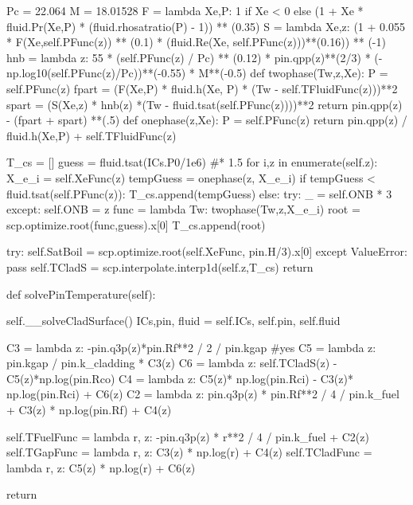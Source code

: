 \documentclass{article}
\begin{document}
\begin{python}
        Pc = 22.064
        M = 18.01528
        F = lambda Xe,P: 1 if Xe < 0 else (1 + Xe * fluid.Pr(Xe,P) * (fluid.rhosatratio(P) - 1)) ** (0.35)
        S = lambda Xe,z: (1 + 0.055 * F(Xe,self.PFunc(z)) ** (0.1) * (fluid.Re(Xe, self.PFunc(z)))**(0.16)) ** (-1)
        hnb = lambda z: 55 * (self.PFunc(z) / Pc) ** (0.12) * pin.qpp(z)**(2/3) * (-np.log10(self.PFunc(z)/Pc))**(-0.55) * M**(-0.5)
        def twophase(Tw,z,Xe):
            P = self.PFunc(z)
            fpart = (F(Xe,P) * fluid.h(Xe, P) * (Tw - self.TFluidFunc(z)))**2
            spart = (S(Xe,z) * hnb(z) *(Tw - fluid.tsat(self.PFunc(z))))**2
            return pin.qpp(z) - (fpart + spart) **(.5)
        def onephase(z,Xe):
            P = self.PFunc(z)
            return pin.qpp(z) / fluid.h(Xe,P) + self.TFluidFunc(z)

        T_cs = []
        guess = fluid.tsat(ICs.P0/1e6) #* 1.5
        for i,z in enumerate(self.z):
            X_e_i = self.XeFunc(z)
            tempGuess = onephase(z, X_e_i)
            if tempGuess < fluid.tsat(self.PFunc(z)):
                T_cs.append(tempGuess)
            else:
                try:
                    _ = self.ONB * 3
                except:
                    self.ONB = z
                func = lambda Tw: twophase(Tw,z,X_e_i)
                root = scp.optimize.root(func,guess).x[0]
                T_cs.append(root)

        try:
            self.SatBoil = scp.optimize.root(self.XeFunc, pin.H/3).x[0]
        except ValueError:
            pass
        self.TCladS = scp.interpolate.interp1d(self.z,T_cs)
        return
            

    def solvePinTemperature(self):

        self.__solveCladSurface()
        ICs,pin, fluid = self.ICs, self.pin, self.fluid

        C3 = lambda z: -pin.q3p(z)*pin.Rf**2 / 2 / pin.kgap #yes
        C5 = lambda z: pin.kgap / pin.k_cladding * C3(z) 
        C6 = lambda z: self.TCladS(z) - C5(z)*np.log(pin.Rco)
        C4 = lambda z: C5(z)* np.log(pin.Rci) - C3(z)* np.log(pin.Rci) + C6(z)
        C2 = lambda z: pin.q3p(z) * pin.Rf**2 / 4 / pin.k_fuel + C3(z) * np.log(pin.Rf) + C4(z)

        self.TFuelFunc = lambda r, z: -pin.q3p(z) * r**2 / 4 / pin.k_fuel + C2(z)
        self.TGapFunc = lambda r, z: C3(z) * np.log(r) + C4(z)
        self.TCladFunc = lambda r, z: C5(z) * np.log(r) + C6(z)
        
        return
        


\end{python}
\end{document}
